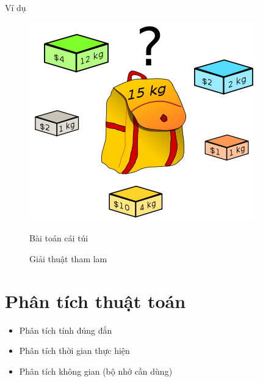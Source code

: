 \documentclass[]{beamer}
\newenvironment{fr}
               {\begin{frame}{\secname}}
               {\end{frame}}
\newenvironment{ffr}
               {\begin{frame}{\subsecname}}
               {\end{frame}}
\begin{document}
\begin{ffr}
\begin{frame}{Ví dụ}
  \begin{figure}[ht]
    \begin{minipage}{0.3\textwidth}
      \centering
      \includegraphics[height=0.3\pageheight]{knapsack.png}
      \caption{Bài toán cái túi}
    \end{minipage}
    \hfill
    \begin{minipage}{0.65\textwidth}
      \begin{algorithm}[H]
        \caption{Giải thuật tham lam}
        \begin{algorithmic}[1]
          \EndWhile
          \EndProcedure
        \end{algorithmic}
      \end{algorithm}
    \end{minipage}
  \end{figure}
\end{frame}

\section{Phân tích thuật toán}
\begin{fr}
  \begin{itemize}
  \item Phân tích tính đúng đắn
  \item Phân tích thời gian thực hiện
  \item Phân tích không gian (bộ nhớ cần dùng)
  \end{itemize}
\end{fr}


\end{ffr}
\end{document}
